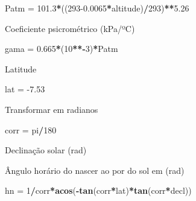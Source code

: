\documentclass[
]{book}
\newenvironment{Shaded}{\begin{snugshade}}{\end{snugshade}}
\newcommand{\DecValTok}[1]{\textcolor[rgb]{0.00,0.00,0.81}{#1}}
\newcommand{\FloatTok}[1]{\textcolor[rgb]{0.00,0.00,0.81}{#1}}
\newcommand{\KeywordTok}[1]{\textcolor[rgb]{0.13,0.29,0.53}{\textbf{#1}}}
\newcommand{\NormalTok}[1]{#1}
\newcommand{\OperatorTok}[1]{\textcolor[rgb]{0.81,0.36,0.00}{\textbf{#1}}}
\newcommand{\StringTok}[1]{\textcolor[rgb]{0.31,0.60,0.02}{#1}}
\begin{document}
\begin{Shaded}
\begin{Highlighting}[]
\NormalTok{Patm =}\StringTok{ }\FloatTok{101.3}\OperatorTok{*}\NormalTok{((}\DecValTok{293}\FloatTok{-0.0065}\OperatorTok{*}\NormalTok{altitude)}\OperatorTok{/}\DecValTok{293}\NormalTok{)}\OperatorTok{**}\FloatTok{5.26} 
\end{Highlighting}
\end{Shaded}

Coeficiente psicrométrico (kPa/ºC)

\begin{Shaded}
\begin{Highlighting}[]
\NormalTok{gama =}\StringTok{ }\FloatTok{0.665}\OperatorTok{*}\NormalTok{(}\DecValTok{10}\OperatorTok{**-}\DecValTok{3}\NormalTok{)}\OperatorTok{*}\NormalTok{Patm }
\end{Highlighting}
\end{Shaded}

Latitude

\begin{Shaded}
\begin{Highlighting}[]
\NormalTok{lat =}\StringTok{ }\FloatTok{-7.53}  
\end{Highlighting}
\end{Shaded}

Transformar em radianos

\begin{Shaded}
\begin{Highlighting}[]
\NormalTok{corr =}\StringTok{ }\NormalTok{pi}\OperatorTok{/}\DecValTok{180} 
\end{Highlighting}
\end{Shaded}

Declinação solar (rad)

\begin{Shaded}
\end{Shaded}

Ângulo horário do nascer ao por do sol em (rad)

\begin{Shaded}
\begin{Highlighting}[]
\NormalTok{hn =}\StringTok{ }\DecValTok{1}\OperatorTok{/}\NormalTok{corr}\OperatorTok{*}\KeywordTok{acos}\NormalTok{(}\OperatorTok{-}\KeywordTok{tan}\NormalTok{(corr}\OperatorTok{*}\NormalTok{lat)}\OperatorTok{*}\KeywordTok{tan}\NormalTok{(corr}\OperatorTok{*}\NormalTok{decl)) }
\end{Highlighting}
\end{Shaded}
\end{document}
